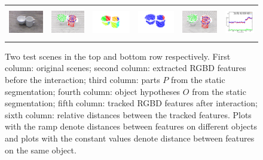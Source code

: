 \begin{figure}[t!]
\begin{centering}
\begin{tabular}{p{}p{}p{}p{}p{}p{}}
    \includegraphics[height=1.35cm]{figures/scene2/image_before1.jpg}
&    \includegraphics[height=1.35cm]{figures/scene2/pcl_before1.png}
&    \includegraphics[height=1.35cm]{figures/scene2/segments1.png}    
&    \includegraphics[height=1.35cm]{figures/scene2/labels1.png}
&    \includegraphics[height=1.35cm]{figures/scene2/pcl_after1.png}  
&    \includegraphics[height=1.35cm]{figures/scene2/distances.png}

  \end{tabular}
    \caption[Two test scenes for our pipeline.]{Two test scenes in the top and bottom row respectively. First column:
      original scenes; second column: extracted RGBD features before the
      interaction; third column: parts $P$ from the static segmentation;
      fourth column: object hypotheses $O$ from the static segmentation; fifth column:
      tracked RGBD features after interaction; sixth column: relative
      distances between the tracked features. Plots with the ramp denote distances between features on different objects 
      and plots with the constant values denote distance between features on the same object.}
    \label{fig:scenes}
  \end{centering}
\end{figure}






